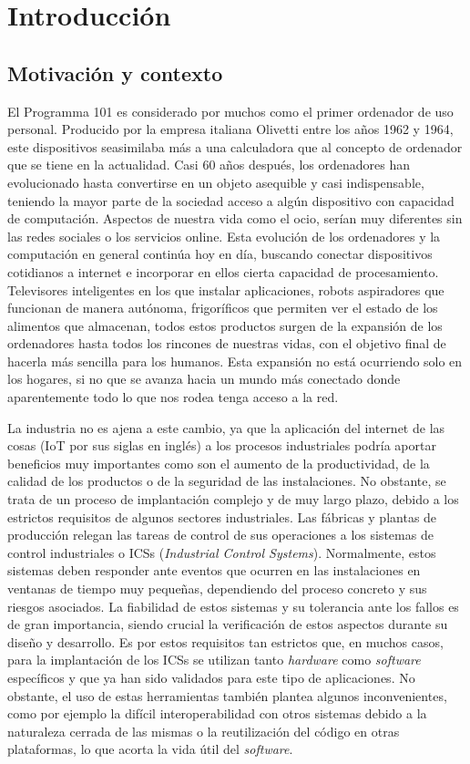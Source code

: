\chapter{Introducción}

\section{Motivación y contexto}

El Programma 101 es considerado por muchos como el primer ordenador de uso
personal. Producido por la empresa italiana Olivetti entre los años 1962 y 1964,
este dispositivos seasimilaba más a una calculadora que al concepto de ordenador
que se tiene en la actualidad. Casi 60 años después, los ordenadores han
evolucionado hasta convertirse en un objeto asequible y casi indispensable,
teniendo la mayor parte de la sociedad acceso a algún dispositivo con capacidad
de computación. Aspectos de nuestra vida como el ocio, serían muy diferentes sin
las redes sociales o los servicios online. Esta evolución de los ordenadores y
la computación en general continúa hoy en día, buscando conectar dispositivos
cotidianos a internet e incorporar en ellos cierta capacidad de procesamiento.
Televisores inteligentes en los que instalar aplicaciones, robots aspiradores
que funcionan de manera autónoma, frigoríficos que permiten ver el estado de los
alimentos que almacenan, todos estos productos surgen de la expansión de los
ordenadores hasta todos los rincones de nuestras vidas, con el objetivo final de
hacerla más sencilla para los humanos. Esta expansión no está ocurriendo solo en
los hogares, si no que se avanza hacia un mundo más conectado donde
aparentemente todo lo que nos rodea tenga acceso a la red.

La industria no es ajena a este cambio, ya que la aplicación del internet de las
cosas (IoT por sus siglas en inglés) a los procesos industriales podría aportar
beneficios muy importantes como son el aumento de la productividad, de la
calidad de los productos o de la seguridad de las instalaciones. No obstante, se
trata de un proceso de implantación complejo y de muy largo plazo, debido a los
estrictos requisitos de algunos sectores industriales. Las fábricas y plantas de
producción relegan las tareas de control de sus operaciones a los sistemas de
control industriales o ICSs (\textit{Industrial Control Systems}). Normalmente,
estos sistemas deben responder ante eventos que ocurren en las instalaciones en
ventanas de tiempo muy pequeñas, dependiendo del proceso concreto y sus riesgos
asociados. La fiabilidad de estos sistemas y su tolerancia ante los fallos es de
gran importancia, siendo crucial la verificación de estos aspectos durante su
diseño y desarrollo. Es por estos requisitos tan estrictos que, en muchos casos,
para la implantación de los ICSs se utilizan tanto \textit{hardware} como
\textit{software} específicos y que ya han sido validados para este tipo de
aplicaciones. No obstante, el uso de estas herramientas también plantea algunos
inconvenientes, como por ejemplo la difícil interoperabilidad con otros sistemas
debido a la naturaleza cerrada de las mismas o la reutilización del código en
otras plataformas, lo que acorta la vida útil del \textit{software}.


